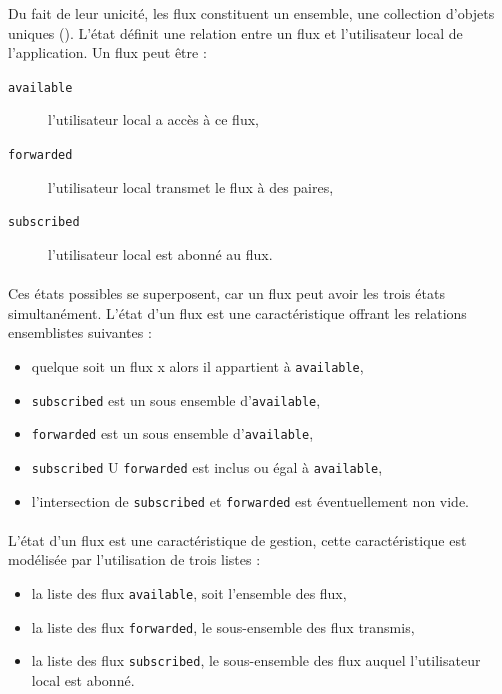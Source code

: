 Du fait de leur unicité, les flux constituent un ensemble, une collection d'objets uniques ().
L'état définit une relation entre un flux et l'utilisateur local de l'application. Un flux
peut être :

\begin{description}
	\item[\texttt{available}] l'utilisateur local a accès à ce flux,
    \item[\texttt{forwarded}] l'utilisateur local transmet le flux à des paires,
    \item[\texttt{subscribed}] l'utilisateur local est abonné au flux.
\end{description}


\paragraph{}

Ces états possibles se superposent, car un flux peut avoir les trois états simultanément.
L'état d'un flux est une caractéristique offrant les relations ensemblistes suivantes :

\begin{itemize}
	\item quelque soit un flux x alors il appartient à \texttt{available},
	\item \texttt{subscribed} est un sous ensemble d'\texttt{available},
	\item \texttt{forwarded} est un sous ensemble d'\texttt{available},
	\item \texttt{subscribed} U \texttt{forwarded} est inclus ou égal à \texttt{available},
	\item l'intersection de \texttt{subscribed} et \texttt{forwarded} est éventuellement non vide.
\end{itemize}


\paragraph{}

L'état d'un flux est une caractéristique de gestion, cette caractéristique est modélisée
par l'utilisation de trois listes :

\begin{itemize}
	\item la liste des flux \texttt{available}, soit l'ensemble des flux,
	\item la liste des flux \texttt{forwarded}, le sous-ensemble des flux transmis,
	\item la liste des flux \texttt{subscribed}, le sous-ensemble des flux auquel l'utilisateur local est abonné.
\end{itemize}



